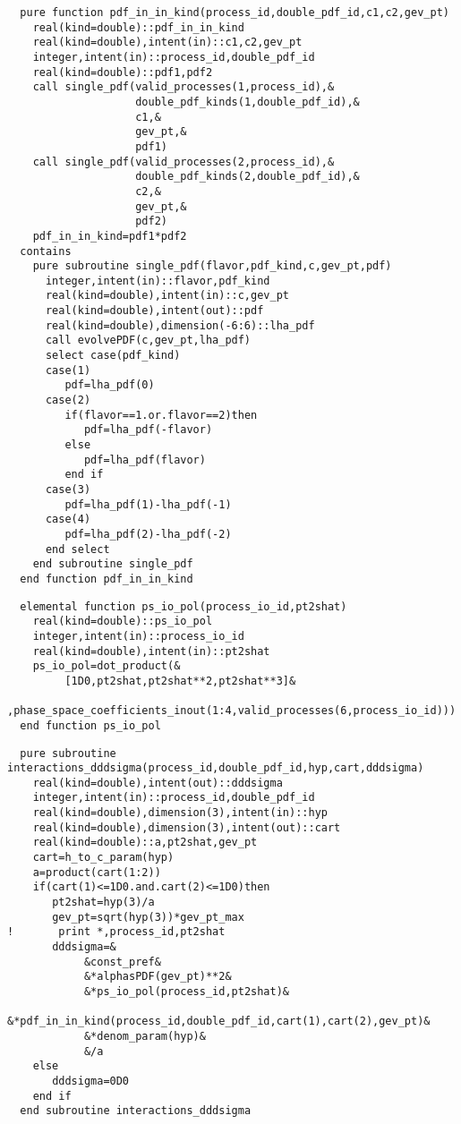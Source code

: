 \begin{Verbatim}
  pure function pdf_in_in_kind(process_id,double_pdf_id,c1,c2,gev_pt)
    real(kind=double)::pdf_in_in_kind
    real(kind=double),intent(in)::c1,c2,gev_pt
    integer,intent(in)::process_id,double_pdf_id
    real(kind=double)::pdf1,pdf2
    call single_pdf(valid_processes(1,process_id),&
                    double_pdf_kinds(1,double_pdf_id),&
                    c1,&
                    gev_pt,&
                    pdf1)
    call single_pdf(valid_processes(2,process_id),&
                    double_pdf_kinds(2,double_pdf_id),&
                    c2,&
                    gev_pt,&
                    pdf2)
    pdf_in_in_kind=pdf1*pdf2
  contains
    pure subroutine single_pdf(flavor,pdf_kind,c,gev_pt,pdf)
      integer,intent(in)::flavor,pdf_kind
      real(kind=double),intent(in)::c,gev_pt
      real(kind=double),intent(out)::pdf
      real(kind=double),dimension(-6:6)::lha_pdf
      call evolvePDF(c,gev_pt,lha_pdf)
      select case(pdf_kind)
      case(1)
         pdf=lha_pdf(0)
      case(2)
         if(flavor==1.or.flavor==2)then
            pdf=lha_pdf(-flavor)
         else
            pdf=lha_pdf(flavor)
         end if
      case(3)
         pdf=lha_pdf(1)-lha_pdf(-1)
      case(4)
         pdf=lha_pdf(2)-lha_pdf(-2)
      end select
    end subroutine single_pdf
  end function pdf_in_in_kind
\end{Verbatim}

\begin{Verbatim}
  elemental function ps_io_pol(process_io_id,pt2shat)
    real(kind=double)::ps_io_pol
    integer,intent(in)::process_io_id
    real(kind=double),intent(in)::pt2shat
    ps_io_pol=dot_product(&
         [1D0,pt2shat,pt2shat**2,pt2shat**3]&
         ,phase_space_coefficients_inout(1:4,valid_processes(6,process_io_id)))
  end function ps_io_pol
\end{Verbatim}

\begin{Verbatim}
  pure subroutine interactions_dddsigma(process_id,double_pdf_id,hyp,cart,dddsigma)
    real(kind=double),intent(out)::dddsigma
    integer,intent(in)::process_id,double_pdf_id
    real(kind=double),dimension(3),intent(in)::hyp
    real(kind=double),dimension(3),intent(out)::cart
    real(kind=double)::a,pt2shat,gev_pt
    cart=h_to_c_param(hyp)
    a=product(cart(1:2))
    if(cart(1)<=1D0.and.cart(2)<=1D0)then
       pt2shat=hyp(3)/a
       gev_pt=sqrt(hyp(3))*gev_pt_max
!       print *,process_id,pt2shat
       dddsigma=&
            &const_pref&
            &*alphasPDF(gev_pt)**2&
            &*ps_io_pol(process_id,pt2shat)&
            &*pdf_in_in_kind(process_id,double_pdf_id,cart(1),cart(2),gev_pt)&
            &*denom_param(hyp)&
            &/a
    else
       dddsigma=0D0
    end if
  end subroutine interactions_dddsigma
\end{Verbatim}

